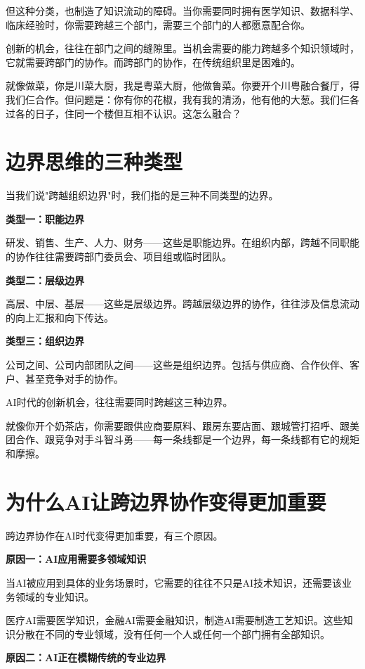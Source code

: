 但这种分类，也制造了知识流动的障碍。当你需要同时拥有医学知识、数据科学、临床经验时，你需要跨越三个部门，需要三个部门的人都愿意配合你。

创新的机会，往往在部门之间的缝隙里。当机会需要的能力跨越多个知识领域时，它就需要跨部门的协作。而跨部门的协作，在传统组织里是困难的。

就像做菜，你是川菜大厨，我是粤菜大厨，他做鲁菜。你要开个川粤融合餐厅，得我们仨合作。但问题是：你有你的花椒，我有我的清汤，他有他的大葱。我们仨各过各的日子，住同一个楼但互相不认识。这怎么融合？

\section{边界思维的三种类型}


当我们说"跨越组织边界"时，我们指的是三种不同类型的边界。

\textbf{类型一：职能边界}

研发、销售、生产、人力、财务——这些是职能边界。在组织内部，跨越不同职能的协作往往需要跨部门委员会、项目组或临时团队。

\textbf{类型二：层级边界}

高层、中层、基层——这些是层级边界。跨越层级边界的协作，往往涉及信息流动的向上汇报和向下传达。

\textbf{类型三：组织边界}

公司之间、公司内部团队之间——这些是组织边界。包括与供应商、合作伙伴、客户、甚至竞争对手的协作。

AI时代的创新机会，往往需要同时跨越这三种边界。

就像你开个奶茶店，你需要跟供应商要原料、跟房东要店面、跟城管打招呼、跟美团合作、跟竞争对手斗智斗勇——每一条线都是一个边界，每一条线都有它的规矩和摩擦。

\section{为什么AI让跨边界协作变得更加重要}


跨边界协作在AI时代变得更加重要，有三个原因。

\textbf{原因一：AI应用需要多领域知识}

当AI被应用到具体的业务场景时，它需要的往往不只是AI技术知识，还需要该业务领域的专业知识。

医疗AI需要医学知识，金融AI需要金融知识，制造AI需要制造工艺知识。这些知识分散在不同的专业领域，没有任何一个人或任何一个部门拥有全部知识。

\textbf{原因二：AI正在模糊传统的专业边界}

